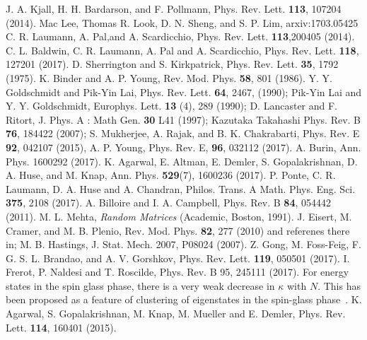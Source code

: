 \documentclass[prl,aps,twocolumn,floats,nofootinbib]{revtex4}
\begin{document}
\begin{thebibliography}{99}
J. A. Kjall, H. H. Bardarson, and F. Pollmann, Phys. Rev. Lett. {\bf 113}, 107204 (2014).
Mac Lee, Thomas R. Look, D. N. Sheng, and S. P. Lim, arxiv:1703.05425 
C. R. Laumann, A. Pal,and A. Scardicchio, Phys. Rev. Lett. {\bf 113},200405 (2014). 
C. L. Baldwin, C. R. Laumann, A. Pal and A. Scardicchio, Phys. Rev. Lett. {\bf 118}, 127201 (2017).
D. Sherrington and S. Kirkpatrick, Phys. Rev. Lett. {\bf 35}, 1792 (1975).
K. Binder and A. P. Young, Rev. Mod. Phys. {\bf 58}, 801 (1986).
Y. Y. Goldschmidt and Pik-Yin Lai, Phys. Rev. Lett. {\bf 64}, 2467, (1990); Pik-Yin Lai and Y. Y. Goldschmidt, Europhys. Lett. {\bf{13}} (4), 289 (1990); D. Lancaster and F. Ritort, J. Phys. A : Math Gen. {\bf 30} L41 (1997); Kazutaka Takahashi Phys. Rev. B {\bf{76}}, 184422 (2007); S. Mukherjee, A. Rajak, and B. K. Chakrabarti, Phys. Rev. E {\bf 92}, 042107 (2015), A. P. Young, Phys. Rev. E, {\bf{96}}, 032112 (2017).
A. Burin, Ann. Phys. 1600292 (2017).
K. Agarwal, E. Altman, E. Demler, S. Gopalakrishnan, D. A. Huse, and M. Knap, Ann. Phys. {\bf 529}(7), 1600236 (2017).
P. Ponte, C. R. Laumann, D. A. Huse and A. Chandran, Philos. Trans. A Math. Phys. Eng. Sci. {\bf 375}, 2108 (2017).
A. Billoire and I. A. Campbell, Phys. Rev. B {\bf 84}, 054442 (2011).  
M. L. Mehta, {\it Random Matrices} (Academic, Boston, 1991).
J. Eisert, M. Cramer, and M. B. Plenio, Rev. Mod. Phys. {\bf 82}, 277 (2010) and referenes there in; M. B. Hastings, J. Stat. Mech. 2007, P08024 (2007).
Z. Gong, M. Foss-Feig, F. G. S. L. Brandao, and A. V. Gorshkov, Phys. Rev. Lett. {\bf 119}, 050501 (2017).
I. Frerot, P. Naldesi and T. Roscilde, Phys. Rev. B 95, 245111 (2017).
For energy states in the spin glass phase, there is a very weak decrease in $\kappa$ with $N$. This has been proposed as a feature of clustering of eigenstates in the spin-glass phase~\cite{Baldwin}.
K. Agarwal, S. Gopalakrishnan, M. Knap, M. Mueller and E. Demler, Phys. Rev. Lett. {\bf 114}, 160401 (2015).
\end{thebibliography}
\end{document}
